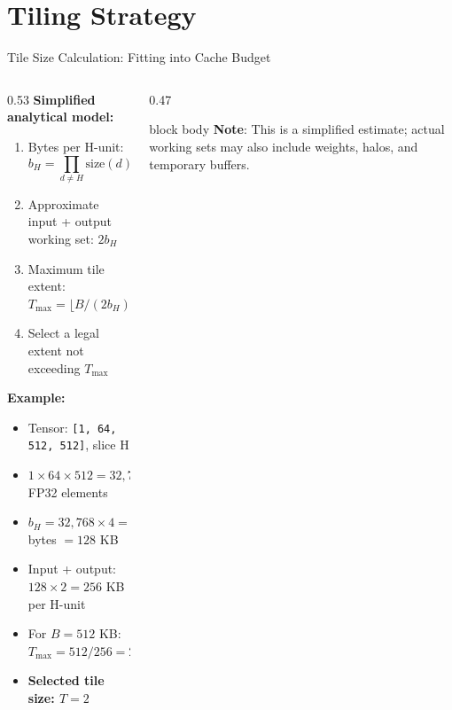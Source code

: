 \documentclass[10pt,aspectratio=169]{beamer}
\begin{document}
\section{Tiling Strategy}
\begin{frame}{Tile Size Calculation: Fitting into Cache Budget}
\begin{columns}
\begin{column}{0.53\textwidth}
\textbf{Simplified analytical model:}
\begin{enumerate}
\small
\item Bytes per H-unit:
\[
b_{H}=\prod_{d\neq H}\text{size}(d)\times4
\]
\item Approximate input + output working set: $2b_H$
\item Maximum tile extent: $T_{\max}=\lfloor B/(2b_H)\rfloor$
\item Select a legal extent not exceeding $T_{\max}$
\end{enumerate}

\textbf{Example:}
\begin{itemize}
\small
\item Tensor: \texttt{[1, 64, 512, 512]}, slice H
\item $1\times64\times512=32{,}768$ FP32 elements
\item $b_H=32{,}768\times4=131{,}072$ bytes $=128$ KB
\item Input + output: $128\times2=256$ KB per H-unit
\item For $B=512$ KB: $T_{\max}=512/256=2$
\item \textcolor{edgegreen}{\textbf{Selected tile size: $T=2$}}
\end{itemize}
\end{column}

\begin{column}{0.47\textwidth}
\centering
{}

\vspace{0.35cm}
\begin{beamercolorbox}[sep=0.3em,center,rounded=true,shadow=true]{block body}
\footnotesize
\textbf{Note}: This is a simplified estimate; actual working sets may also include weights, halos, and temporary buffers.
\end{beamercolorbox}
\end{column}
\end{columns}
\end{frame}
\end{document}
